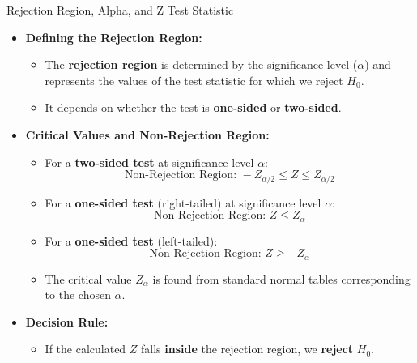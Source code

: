 \documentclass[handout]{beamer} %
\begin{document}
\begin{frame}{Rejection Region, Alpha, and Z Test Statistic}
    \begin{itemize}
        \item \textbf{Defining the Rejection Region:}
        \begin{itemize}
            \item The \textbf{rejection region} is determined by the significance level (\( \alpha \)) and represents the values of the test statistic for which we reject \( H_0 \).
            \item It depends on whether the test is \textbf{one-sided} or \textbf{two-sided}.
        \end{itemize}
        \item \textbf{Critical Values and Non-Rejection Region:}
        \begin{itemize}
            \item For a \textbf{two-sided test} at significance level \( \alpha \):
            \[
                \text{Non-Rejection Region: } -Z_{\alpha/2} \leq Z \leq Z_{\alpha/2}
            \]
            \item For a \textbf{one-sided test} (right-tailed) at significance level \( \alpha \):
            \[
                \text{Non-Rejection Region: } Z \leq Z_{\alpha}
            \]
            \item For a \textbf{one-sided test} (left-tailed):
            \[
                \text{Non-Rejection Region: } Z \geq -Z_{\alpha}
            \]
            \item The critical value \( Z_{\alpha} \) is found from standard normal tables corresponding to the chosen \( \alpha \).
        \end{itemize}
        \item \textbf{Decision Rule:}
        \begin{itemize}
            \item If the calculated \( Z \) falls \textbf{inside} the rejection region, we \textbf{reject} \( H_0 \).
        \end{itemize}
    \end{itemize}
\end{frame}
\end{document}
